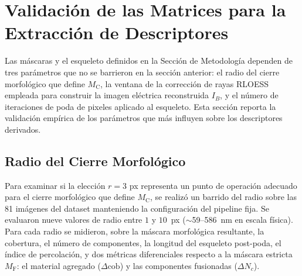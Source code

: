 \section{Validación de las Matrices para la Extracción de Descriptores}
\label{sec:representaciones}
 
Las máscaras y el esqueleto definidos en la Sección de Metodología dependen de tres parámetros que no se barrieron en la sección anterior: el radio del cierre morfológico que define $M_{\mathrm{C}}$, la ventana de la corrección de rayas RLOESS empleada para construir la imagen eléctrica reconstruida $I_B$, y el número de iteraciones de poda de pixeles aplicado al esqueleto. Esta sección reporta la validación empírica de los parámetros que más influyen sobre los descriptores derivados.
 
\subsection{Radio del Cierre Morfológico}
\label{sec:radio_cierre}
 
Para examinar si la elección $r=3$ px representa un punto de operación adecuado para el cierre morfológico que define $M_{\mathrm{C}}$, se realizó un barrido del radio sobre las 81 imágenes del dataset manteniendo la configuración del pipeline fija. Se evaluaron nueve valores de radio entre $1$ y $10$~px ($\sim$59--586~nm en escala física). Para cada radio se midieron, sobre la máscara morfológica resultante, la cobertura, el número de componentes, la longitud del esqueleto post-poda, el índice de percolación, y dos métricas diferenciales respecto a la máscara estricta $M_{\mathrm{F}}$: el material agregado ($\Delta\text{cob}$) y las componentes fusionadas ($\Delta N_c$).
 
